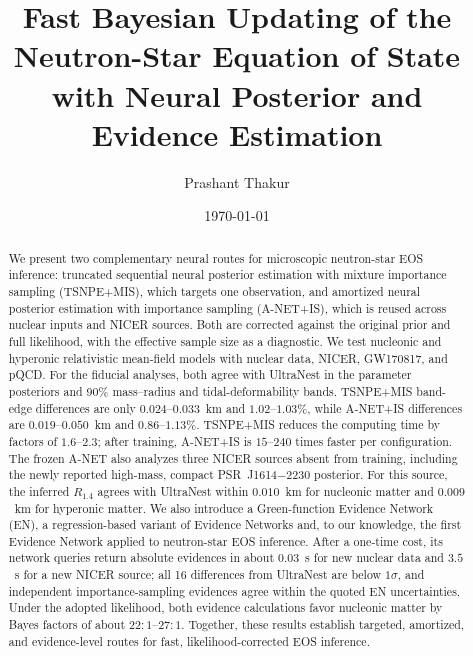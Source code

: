 \documentclass[aps,prd,twocolumn,superscriptaddress,nofootinbib,longbibliography]{revtex4-2}
\begin{document}
\title{Fast Bayesian Updating of the Neutron-Star Equation of State with
Neural Posterior and Evidence Estimation}

\author{Prashant Thakur}

\date{\today}

\begin{abstract}
We present two complementary neural routes for microscopic
neutron-star EOS inference: truncated sequential neural posterior estimation
with mixture importance sampling (TSNPE+MIS), which targets one observation,
and amortized neural posterior estimation with importance sampling (A-NET+IS),
which is reused across nuclear inputs and NICER sources. Both are corrected
against the original prior and full likelihood, with the effective sample size
as a diagnostic. We test nucleonic and hyperonic relativistic mean-field models
with nuclear data, NICER, GW170817, and pQCD. For the fiducial analyses, both
agree with UltraNest in the parameter posteriors and 90\% mass--radius and
tidal-deformability bands. TSNPE+MIS band-edge differences
are only $0.024$--$0.033$~km and $1.02$--$1.03\%$, while A-NET+IS differences
are $0.019$--$0.050$~km and $0.86$--$1.13\%$. TSNPE+MIS reduces the computing time
by factors of $1.6$--$2.3$; after training, A-NET+IS is $15$--$240$ times faster
per configuration. The frozen A-NET also analyzes three NICER sources absent
from training, including the newly reported high-mass, compact
PSR~J1614$-$2230 posterior. For this source, the inferred $R_{1.4}$ agrees with
UltraNest within $0.010$~km for nucleonic matter and $0.009$~km for hyperonic
matter. We also introduce a Green-function Evidence Network (EN), a
regression-based variant of Evidence Networks and, to our knowledge, the first
Evidence Network applied to neutron-star EOS inference. After a one-time cost,
its network queries return absolute evidences in about $0.03$~s for new
nuclear data and $3.5$~s for a new NICER source; all 16 differences from UltraNest are below
$1\sigma$, and independent importance-sampling evidences agree within the quoted EN uncertainties. Under the adopted likelihood, both evidence calculations
favor nucleonic matter by Bayes factors of about $22{:}1$--$27{:}1$. Together, these results establish targeted, amortized, and
evidence-level routes for fast, likelihood-corrected EOS inference.
\end{abstract}

\maketitle
\end{document}
